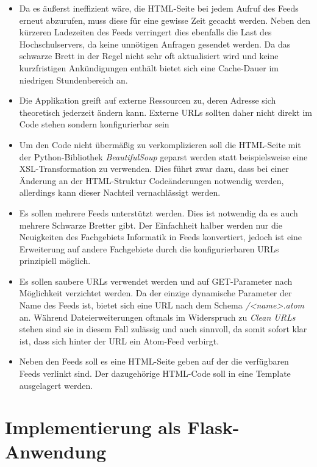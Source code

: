 \begin{itemize}
\item Da es äußerst ineffizient wäre, die HTML-Seite bei jedem Aufruf des Feeds erneut abzurufen,
muss diese für eine gewisse Zeit gecacht werden. Neben den kürzeren Ladezeiten des Feeds verringert
dies ebenfalls die Last des Hochschulservers, da keine unnötigen Anfragen gesendet werden. Da das
schwarze Brett in der Regel nicht sehr oft aktualisiert wird und keine kurzfristigen Ankündigungen
enthält bietet sich eine Cache-Dauer im niedrigen Stundenbereich an.

\item Die Applikation greift auf externe Ressourcen zu, deren Adresse sich theoretisch jederzeit
ändern kann. Externe URLs sollten daher nicht direkt im Code stehen sondern konfigurierbar sein

\item Um den Code nicht übermäßig zu verkomplizieren soll die HTML-Seite mit der Python-Bibliothek
\emph{BeautifulSoup} geparst werden statt beispielsweise eine XSL-Transformation zu verwenden. Dies
führt zwar dazu, dass bei einer Änderung an der HTML-Struktur Codeänderungen notwendig werden,
allerdings kann dieser Nachteil vernachlässigt werden.

\item Es sollen mehrere Feeds unterstützt werden. Dies ist notwendig da es auch mehrere Schwarze
Bretter gibt. Der Einfachheit halber werden nur die Neuigkeiten des Fachgebiets Informatik in Feeds
konvertiert, jedoch ist eine Erweiterung auf andere Fachgebiete durch die konfigurierbaren URLs
prinzipiell möglich.

\item Es sollen saubere URLs verwendet werden und auf GET-Parameter nach Möglichkeit verzichtet
werden. Da der einzige dynamische Parameter der Name des Feeds ist, bietet sich eine URL nach dem
Schema \emph{/<name>.atom} an. Während Dateierweiterungen oftmals im Widerspruch zu \emph{Clean
URLs} stehen sind sie in diesem Fall zulässig und auch sinnvoll, da somit sofort klar ist, dass sich
hinter der URL ein Atom-Feed verbirgt.

\item Neben den Feeds soll es eine HTML-Seite geben auf der die verfügbaren Feeds verlinkt sind. Der
dazugehörige HTML-Code soll in eine Template ausgelagert werden.
\end{itemize}

\section{Implementierung als Flask-Anwendung}

